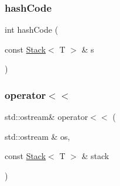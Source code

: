 \subsubsection{\texorpdfstring{hash\+Code}{hashCode}}
{\footnotesize\ttfamily int hash\+Code (\begin{DoxyParamCaption}\item[{const \mbox{\hyperlink{classStack}{Stack}}$<$ T $>$ \&}]{s }\end{DoxyParamCaption})\hspace{0.3cm}{\ttfamily [friend]}}

\mbox{\label{classStack_a047eaf65350ba824d7aa36c925289d9c}} 
\subsubsection{\texorpdfstring{operator$<$$<$}{operator<<}}
{\footnotesize\ttfamily std\+::ostream\& operator$<$$<$ (\begin{DoxyParamCaption}\item[{std\+::ostream \&}]{os,  }\item[{const \mbox{\hyperlink{classStack}{Stack}}$<$ T $>$ \&}]{stack }\end{DoxyParamCaption})\hspace{0.3cm}{\ttfamily [friend]}}

